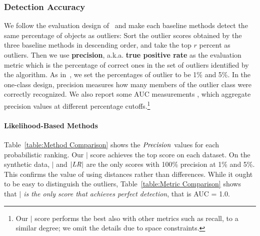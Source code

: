 \documentclass[conference]{IEEEtran}
\begin{document}
						\subsubsection{Detection Accuracy} We follow the evaluation design of~\cite{Gao2010} and 
	make each baseline methods detect the same percentage of  objects as outliers:
					Sort the outlier scores obtained by the three baseline methods in descending order, and take the top $r$ percent as outliers. Then we use \textbf{precision}, a.k.a. \textbf{true positive rate} as the evaluation metric which is the percentage of correct ones in the set of outliers identified by the algorithm. As in~\cite{Gao2010}, we set the percentages of outlier to be 1\% and 5\%. In the one-class design, precision measures how many members of the outlier class were correctly recognized. We also report some AUC measurements \cite{aggarwal2013}, which aggregate precision values at different percentage cutoffs.\footnote{Our $\mid$ score performs the best also with other metrics such as recall, to a similar degree; we omit the details due to space constraints.} %

						
						\paragraph{Likelihood-Based Methods} 
						
						
						Table~\ref{table:Method Comparison} shows the $\it{Precision}$ values for each probabilistic ranking. Our $\mid$ score achieves the top score on each dataset. On the synthetic data, $\mid$ and $|\it{LR}|$ are the only scores with 100\% precision at 1\% and 5\%. This confirms the value of using distances rather than differences. 
						While it ought to be easy to distinguish the outliers, Table~\ref{table:Metric Comparison} shows that {\em $\mid$  is the only score that achieves perfect detection}, that is AUC = 1.0.
						
\end{document}
